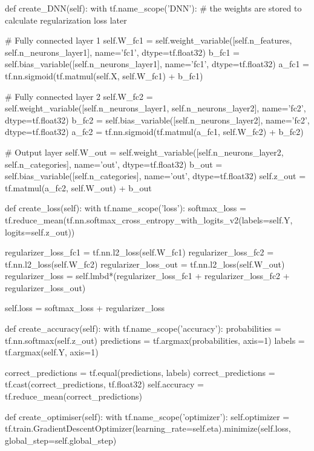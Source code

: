 \documentclass[%
oneside,                 %
final,                   %
10pt]{article}
\begin{document}
    def create_DNN(self):
        with tf.name_scope('DNN'):
            # the weights are stored to calculate regularization loss later
            
            # Fully connected layer 1
            self.W_fc1 = self.weight_variable([self.n_features, self.n_neurons_layer1], name='fc1', dtype=tf.float32)
            b_fc1 = self.bias_variable([self.n_neurons_layer1], name='fc1', dtype=tf.float32)
            a_fc1 = tf.nn.sigmoid(tf.matmul(self.X, self.W_fc1) + b_fc1)
            
            # Fully connected layer 2
            self.W_fc2 = self.weight_variable([self.n_neurons_layer1, self.n_neurons_layer2], name='fc2', dtype=tf.float32)
            b_fc2 = self.bias_variable([self.n_neurons_layer2], name='fc2', dtype=tf.float32)
            a_fc2 = tf.nn.sigmoid(tf.matmul(a_fc1, self.W_fc2) + b_fc2)
            
            # Output layer
            self.W_out = self.weight_variable([self.n_neurons_layer2, self.n_categories], name='out', dtype=tf.float32)
            b_out = self.bias_variable([self.n_categories], name='out', dtype=tf.float32)
            self.z_out = tf.matmul(a_fc2, self.W_out) + b_out
    
    def create_loss(self):
        with tf.name_scope('loss'):
            softmax_loss = tf.reduce_mean(tf.nn.softmax_cross_entropy_with_logits_v2(labels=self.Y, logits=self.z_out))
            
            regularizer_loss_fc1 = tf.nn.l2_loss(self.W_fc1)
            regularizer_loss_fc2 = tf.nn.l2_loss(self.W_fc2)
            regularizer_loss_out = tf.nn.l2_loss(self.W_out)
            regularizer_loss = self.lmbd*(regularizer_loss_fc1 + regularizer_loss_fc2 + regularizer_loss_out)
            
            self.loss = softmax_loss + regularizer_loss

    def create_accuracy(self):
        with tf.name_scope('accuracy'):
            probabilities = tf.nn.softmax(self.z_out)
            predictions = tf.argmax(probabilities, axis=1)
            labels = tf.argmax(self.Y, axis=1)
            
            correct_predictions = tf.equal(predictions, labels)
            correct_predictions = tf.cast(correct_predictions, tf.float32)
            self.accuracy = tf.reduce_mean(correct_predictions)
    
    def create_optimiser(self):
        with tf.name_scope('optimizer'):
            self.optimizer = tf.train.GradientDescentOptimizer(learning_rate=self.eta).minimize(self.loss, global_step=self.global_step)
            
\end{document}
